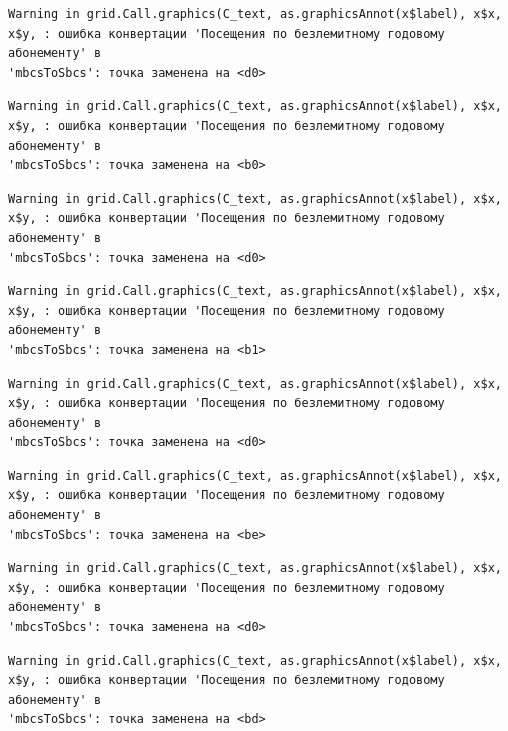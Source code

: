 \documentclass[
  letterpaper,
  DIV=11,
  numbers=noendperiod]{scrreprt}
\begin{document}
\begin{verbatim}
Warning in grid.Call.graphics(C_text, as.graphicsAnnot(x$label), x$x,
x$y, : ошибка конвертации 'Посещения по безлемитному годовому абонементу' в
'mbcsToSbcs': точка заменена на <d0>
\end{verbatim}

\begin{verbatim}
Warning in grid.Call.graphics(C_text, as.graphicsAnnot(x$label), x$x,
x$y, : ошибка конвертации 'Посещения по безлемитному годовому абонементу' в
'mbcsToSbcs': точка заменена на <b0>
\end{verbatim}

\begin{verbatim}
Warning in grid.Call.graphics(C_text, as.graphicsAnnot(x$label), x$x,
x$y, : ошибка конвертации 'Посещения по безлемитному годовому абонементу' в
'mbcsToSbcs': точка заменена на <d0>
\end{verbatim}

\begin{verbatim}
Warning in grid.Call.graphics(C_text, as.graphicsAnnot(x$label), x$x,
x$y, : ошибка конвертации 'Посещения по безлемитному годовому абонементу' в
'mbcsToSbcs': точка заменена на <b1>
\end{verbatim}

\begin{verbatim}
Warning in grid.Call.graphics(C_text, as.graphicsAnnot(x$label), x$x,
x$y, : ошибка конвертации 'Посещения по безлемитному годовому абонементу' в
'mbcsToSbcs': точка заменена на <d0>
\end{verbatim}

\begin{verbatim}
Warning in grid.Call.graphics(C_text, as.graphicsAnnot(x$label), x$x,
x$y, : ошибка конвертации 'Посещения по безлемитному годовому абонементу' в
'mbcsToSbcs': точка заменена на <be>
\end{verbatim}

\begin{verbatim}
Warning in grid.Call.graphics(C_text, as.graphicsAnnot(x$label), x$x,
x$y, : ошибка конвертации 'Посещения по безлемитному годовому абонементу' в
'mbcsToSbcs': точка заменена на <d0>
\end{verbatim}

\begin{verbatim}
Warning in grid.Call.graphics(C_text, as.graphicsAnnot(x$label), x$x,
x$y, : ошибка конвертации 'Посещения по безлемитному годовому абонементу' в
'mbcsToSbcs': точка заменена на <bd>
\end{verbatim}
\end{document}
